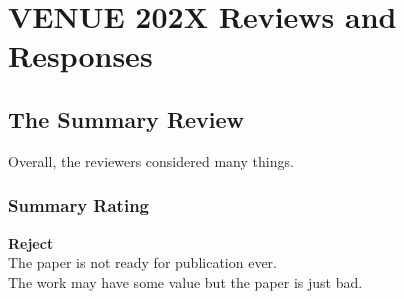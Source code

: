 \section{VENUE 202X Reviews and Responses} \label{sec:reviewsFull}

\subsection{The Summary Review}
Overall, the reviewers considered many things.

\subsubsection{Summary Rating}
\textbf{Reject} \\
The paper is not ready for publication ever. \\
The work may have some value but the paper is just bad.






